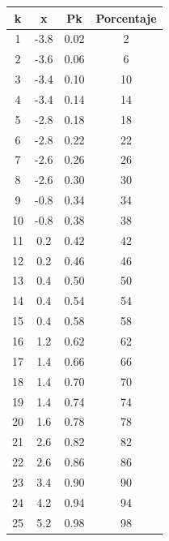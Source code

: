 \documentclass[
  10pt,
  ignorenonframetext,
]{beamer}
\begin{document}
\begin{frame}{}
\begin{minipage}{\textwidth}
\begin{multicols}{2}
\begin{table}
\begin{tabular}{c|c|c|c}
\hline
k & x & Pk & Porcentaje\\
\hline
1 & -3.8 & 0.02 & 2\\
\hline
2 & -3.6 & 0.06 & 6\\
\hline
3 & -3.4 & 0.10 & 10\\
\hline
4 & -3.4 & 0.14 & 14\\
\hline
5 & -2.8 & 0.18 & 18\\
\hline
6 & -2.8 & 0.22 & 22\\
\hline
7 & -2.6 & 0.26 & 26\\
\hline
8 & -2.6 & 0.30 & 30\\
\hline
9 & -0.8 & 0.34 & 34\\
\hline
10 & -0.8 & 0.38 & 38\\
\hline
11 & 0.2 & 0.42 & 42\\
\hline
12 & 0.2 & 0.46 & 46\\
\hline
13 & 0.4 & 0.50 & 50\\
\hline
14 & 0.4 & 0.54 & 54\\
\hline
15 & 0.4 & 0.58 & 58\\
\hline
16 & 1.2 & 0.62 & 62\\
\hline
17 & 1.4 & 0.66 & 66\\
\hline
18 & 1.4 & 0.70 & 70\\
\hline
19 & 1.4 & 0.74 & 74\\
\hline
20 & 1.6 & 0.78 & 78\\
\hline
21 & 2.6 & 0.82 & 82\\
\hline
22 & 2.6 & 0.86 & 86\\
\hline
23 & 3.4 & 0.90 & 90\\
\hline
24 & 4.2 & 0.94 & 94\\
\hline
25 & 5.2 & 0.98 & 98\\
\hline
\end{tabular}
\endgroup{}
\end{table}




\end{multicols}

\end{minipage}
\end{frame}
\end{document}
